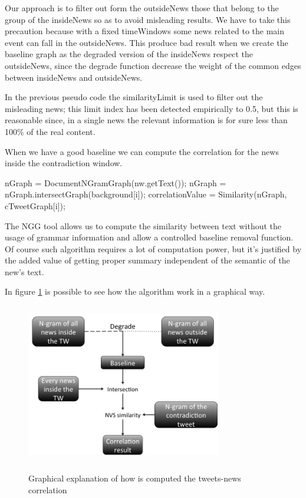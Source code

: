 Our approach is to filter out form the outsideNews those that belong to the group of the insideNews so as to avoid misleading results.
We have to take this precaution because with a fixed timeWindows some news related to the main event can fall in the outsideNews.
This produce bad result when we create the baseline graph as the degraded version of the insideNews respect the outsideNews, since the degrade function decrease the weight of the common edges between insideNews and outsideNews. 

In the previous pseudo code the similarityLimit is used to filter out the misleading news; this limit index has been detected empirically to 0.5, but this is reasonable since, in a single news the relevant information is for sure less than 100\% of the real content.

When we have a good baseline we can compute the correlation for the news inside the contradiction window.
\begin{algorithmic}
		\STATE nGraph = DocumentNGramGraph(nw.getText());
        \STATE nGraph = nGraph.intersectGraph(background[i]);
        \STATE correlationValue = Similarity(nGraph, cTweetGraph[i]);
	\ENDIF
\ENDFOR        
\end{algorithmic}

The NGG tool allows us to compute the similarity between text without the usage of grammar information and allow a controlled baseline removal function.
Of course such algorithm requires a lot of computation power, but it's justified by the added value of getting proper summary independent of the semantic of the new's text.

In figure \ref{fig:N-gram-expl} is possible to see how the algorithm work in a graphical way.

\begin{figure}[htbp]
	\centering
			{\includegraphics[width=8.5cm,height=7cm]{image/N-gram-expl.png}}	
		\caption[N-gram-expl]{Graphical explanation of how is computed the tweets-news correlation}
	\label{fig:N-gram-expl}
\end{figure} 

